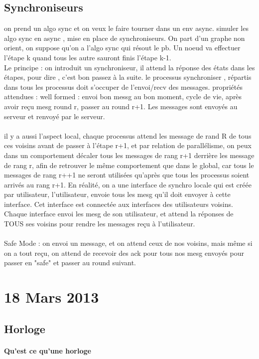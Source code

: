 \documentclass{article}
\begin{document}
\subsection{Synchroniseurs}
on prend un algo sync et on veux le faire tourner dans un env async. simuler les algo sync en async , mise en place de synchroniseurs. On part d'un graphe non orient, on suppose qu'on a l'algo sync qui résout le pb. Un noeud va effectuer l'étape k quand tous les autre sauront finis l'étape k-1.\\Le principe : on introduit un synchroniseur, il attend la réponse des états dans les étapes, pour dire , c'est bon passez à la suite. le processus synchroniser , répartis dans tous les processus doit s'occuper de l'envoi/recv des messages. propriétés attendues : well formed : envoi bon messg au bon moment, cycle de vie, après avoir reçu mesg round r, passer au round r+1. Les messages sont envoyés au serveur et renvoyé par le serveur.\\\\ il y a aussi l'aspect local, chaque processus attend les message de rand R de tous ces voisins avant de passer à l'étape r+1, et par relation de parallélisme, on peux dans un comportement décaler tous les messages de rang r+1 derrière les message de rang r, afin de retrouver le même comportement que dans le global, car tous le messages de rang r++1 ne seront utilisées qu’après que tous les processus soient arrivés au rang r+1. En réalité, on a une interface de synchro locale qui est créée par utilisateur, l'utilisateur, envoie tous les mesg qu'il doit envoyer à cette interface. Cet interface est connectée aux interfaces des utilisateurs voisins. Chaque interface envoi les mesg de son utilisateur, et attend la réponses de TOUS ses voisins pour rendre les messages reçu à l'utilisateur. \\\\Safe Mode : on envoi un message, et on attend ceux de nos voisins,  mais même si on a tout reçu, on attend de recevoir des ack pour tous nos mesg envoyés pour passer en "safe" et passer au round suivant.

\section{18 Mars 2013}
\subsection{Horloge}  
\paragraph{Qu'est ce qu'une horloge}
\end{document}

